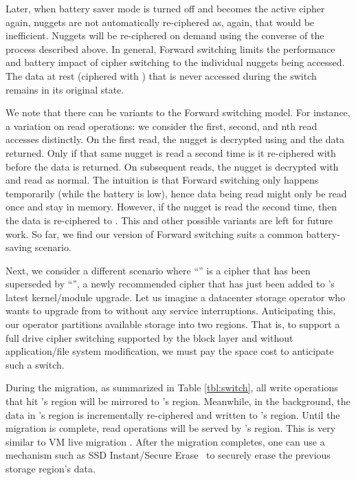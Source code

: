 Later, when battery saver mode is turned off and \cone becomes the active cipher
again, nuggets are not automatically re-ciphered as, again, that would be
inefficient. Nuggets will be re-ciphered on demand using the converse of the
process described above. In general, Forward switching limits the performance
and battery impact of cipher switching to the individual nuggets being accessed.
The data at rest (ciphered with \cone) that is never accessed during the switch
remains in its original state.

We note that there can be variants to the Forward switching model. For instance,
a variation on read operations: we consider the first, second, and nth read
accesses distinctly. On the first read, the nugget is decrypted using \cone and
the data returned. Only if that same nugget is read a second time is it
re-ciphered with \ctwo before the data is returned. On subsequent reads, the
nugget is decrypted with \ctwo and read as normal. The intuition is that Forward
switching only happens temporarily (\eg while the battery is low), hence data
being read might only be read once and stay in memory. However, if the nugget is
read the second time, then the data is re-ciphered to \ctwo. This and other
possible variants are left for future work. So far, we find our version of
Forward switching suits a common battery-saving scenario.



 Next, we consider a different scenario where
``\cone'' is a cipher that has been superseded by ``\ctwo'', a newly recommended
cipher that has just been added to \sys's latest kernel/module upgrade. Let us
imagine a datacenter storage operator who wants to upgrade from \cone to \ctwo
without any service interruptions. Anticipating this, our operator partitions
available storage into two regions. That is, to support a full drive cipher
switching supported by the block layer and without application/file system
modification, we must pay the space cost to anticipate such a switch.

During the migration, as summarized in Table \cref{tbl:switch}, all write
operations that hit \cone's region will be mirrored to \ctwo's region.
Meanwhile, in the background, the data in \cone's region is incrementally
re-ciphered and written to \ctwo's region. Until the migration is complete, read
operations will be served by \cone's region. This is very similar to VM live
migration \cite{live-vm-migration}. After the migration completes, one can use a
mechanism such as SSD Instant/Secure Erase~\cite{ISE1,ISE2,ISE3} to securely
erase the previous storage region's data.

